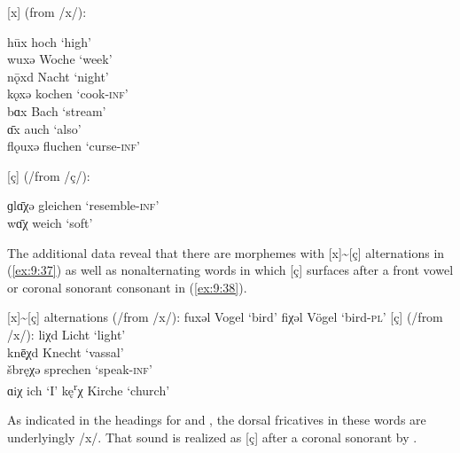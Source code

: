 \ea%
\label{ex:9:35} [x] (from /x/):\\
    \begin{xlist}
    \sn
    hūx    \tab [huːx] \tab hoch \tab ‘high’ \\
    wuxə   \tab  [vuxə] \tab Woche \tab ‘week’ \\
    nǭxd  \tab  [nɔːxt] \tab Nacht \tab ‘night’ \\
    kǫxə   \tab  [kɔxə] \tab kochen \tab ‘cook-\textsc{inf}’ \\
    bɑx    \tab [bɑx] \tab Bach \tab ‘stream’ \\
    ɑ̄x     \tab [ɑːx] \tab auch \tab ‘also’ \\
    flǫuxə \tab [flɔuxə] \tab fluchen \tab ‘curse-\textsc{inf}’ 
    \end{xlist} 
\z
\pagebreak
\ea%
\label{ex:9:36} [ç] (/from /ç/):\\
    \begin{xlist}
    \sn
    ɡlɑ̄χə \tab  [glɑːçə] \tab gleichen \tab ‘resemble-\textsc{inf}’ \\
    wɑ̄χ \tab [vɑːç] \tab weich \tab ‘soft’ 
    \end{xlist}
\z 

The additional data reveal that there are morphemes with [x]{\textasciitilde}[ç] alternations in (\ref{ex:9:37}) as well as nonalternating words in which [ç] surfaces after a front vowel or coronal sonorant consonant in (\ref{ex:9:38}).

\ea%
\label{ex:9:37} [x]{\textasciitilde}[ç] alternations (/from /x/):
\ea\label{ex:9:37a}  fuxəl \tab [fuxəl] \tab Vogel \tab ‘bird’ 
\ex\label{ex:9:37b}  fiχəl \tab [fiçəl] \tab Vögel \tab ‘bird-\textsc{pl}’ 
\z 
\ex%
\label{ex:9:38} [ç] (/from /x/):
\ea\label{ex:9:38a}  liχd \tab [liçt] \tab Licht \tab ‘light’ \\
     knē̜χd \tab [knɛːçt] \tab Knecht \tab ‘vassal’ \\
     šbręχə \tab [ʃprɛçə] \tab sprechen \tab ‘speak-\textsc{inf}’ \\
     ɑiχ \tab [ɑiç] \tab ich \tab ‘I’ 
\ex\label{ex:9:38b}  kę\textsuperscript{r}χ \tab [kɛrç] \tab Kirche \tab ‘church’ 
\z 
\z 

As indicated in the headings for  and , the dorsal fricatives in these words are underlyingly /x/. That sound is realized as [ç] after a coronal sonorant by .

